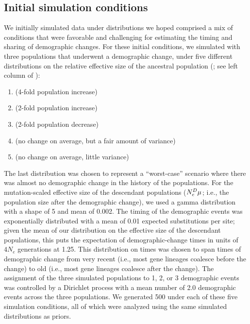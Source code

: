 \subsection{Initial simulation conditions}

We initially simulated data under distributions we hoped comprised a mix of
conditions that were favorable and challenging for estimating the timing and
sharing of demographic changes.
For these initial conditions, we simulated \datasets with three populations
that underwent a demographic change, under five different distributions on the
relative effective size of the ancestral population
(\rootrelativepopsize; see left column of
\figs
{}):
\begin{enumerate}[label=A.\arabic*]
    \item {} (4-fold population increase) \label{sims:initialFourFoldIncrease}
    \item {} (2-fold population increase)  \label{sims:initialTwoFoldIncrease}
    \item {} (2-fold population decrease)    \label{sims:initialTwoFoldDecrease}
    \item {} (no change on average, but a fair amount of variance) \label{sims:initialCenter}
    \item {} (no change on average, little variance) \label{sims:initialCenterNarrow}
\end{enumerate}
The last distribution was chosen to represent a ``worst-case'' scenario where
there was almost no demographic change in the history of the populations.
For the mutation-scaled effective size of the descendant populations
($\epopsize[\descendantpopindex{}]\murate$; i.e., the population size after the
demographic change),
we used a gamma distribution with a shape of 5 and mean of 0.002.
The timing of the demographic events was exponentially distributed with a mean
of 0.01 expected substitutions per site;
given the mean of our distribution on the effective size of the descendant
populations, this puts the expectation of demographic-change times in units of
$4N_e$ generations at 1.25.
This distribution on times was chosen to span times of demographic change from
very recent (i.e., most gene lineages coalesce before the change) to old (i.e.,
most gene lineages coalesce after the change).
The assignment of the three simulated populations to 1, 2, or 3 demographic
events was controlled by a Dirichlet process with a mean number of 2.0
demographic events across the three populations.
We generated 500 \datasets under each of these five simulation conditions, all
of which were analyzed using the same simulated distributions as priors.
